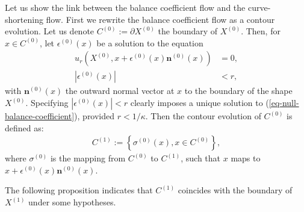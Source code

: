 \documentclass[smallextended]{svjour3}
\newcommand{\Equ}[1]{(\ref{#1})}
\begin{document}
Let us show the link between the balance coefficient flow and the
curve-shortening flow. First we rewrite the balance coefficient flow
as a contour evolution. Let us denote $C^{(0)} := \partial
X^{(0)}$ the boundary of $X^{(0)}$. Then, for $x \in C^{(0)}$,
let $\epsilon^{(0)}(x)$ be a solution to the equation
\begin{align} \label{eq-null-balance-coefficient}
  u_r(X^{(0)}, x +\epsilon^{(0)}(x)
  \mathbf{n}^{(0)}(x)) & = 0, \\
  |\epsilon^{(0)}(x)| & < r, \nonumber
\end{align}
with $\mathbf{n}^{(0)}(x)$ the outward normal vector at $x$ to
the boundary of the shape $X^{(0)}$. Specifying
$|\epsilon^{(0)}(x)| < r$ clearly imposes a unique solution to
\Equ{eq-null-balance-coefficient}, provided $r < 1/\kappa$. Then the
contour evolution of $C^{(0)}$ is defined as:
\begin{align} \label{eq-balance-coefficient-contour-flow}
  C^{(1)} := \left\{ \sigma^{(0)}(x), x \in C^{(0)} \right\},
\end{align}
where $\sigma^{(0)}$ is the mapping from $C^{(0)}$ to $C^{(1)}$, such that $x$ maps to $x+\epsilon^{(0)}(x) \mathbf{n}^{(0)}(x)$.

The following proposition indicates that $C^{(1)}$ coincides with
the boundary of $X^{(1)}$ under some hypotheses.
\end{document}
